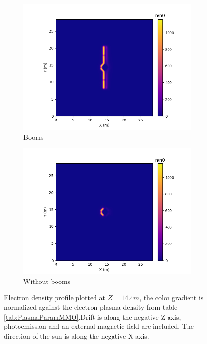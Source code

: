 \begin{figure}[H]
  \begin{subfigure}[b]{0.6\textwidth}
  \includegraphics[width=\textwidth]{figures/MMO/BField/WB/E_BField_WB.png}
  \caption{Booms}
  \label{fig:E_BField_WB}
\end{subfigure}
\begin{subfigure}[b]{0.6\textwidth}
  \includegraphics[width=\textwidth]{figures/MMO/BField/NB/E_BField_NB.png}
  \caption{Without booms}
  \label{fig:E_BField_NB}
\end{subfigure}
\label{fig:Elec_BField}
\caption{Electron density profile plotted at $Z = 14.4 m$, the color gradient is normalized against the electron plasma density from table \ref{tab:PlasmaParamMMO}.Drift is along the negative Z axis, photoemission and an external magnetic field are included. The direction of the sun is along the negative X axis.}
\end{figure}


